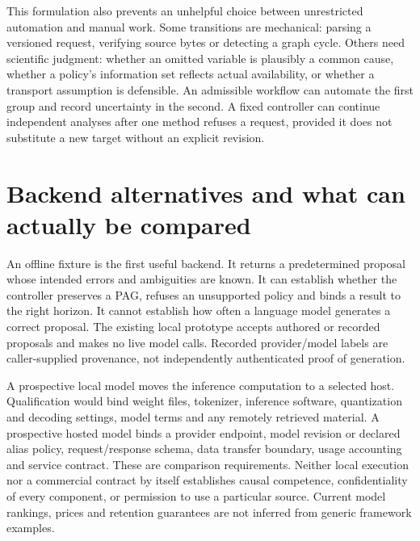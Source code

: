 This formulation also prevents an unhelpful choice between unrestricted
automation and manual work. Some transitions are mechanical: parsing a
versioned request, verifying source bytes or detecting a graph cycle. Others
need scientific judgment: whether an omitted variable is plausibly a common
cause, whether a policy's information set reflects actual availability, or
whether a transport assumption is defensible. An admissible workflow can
automate the first group and record uncertainty in the second. A fixed
controller can continue independent analyses after one method refuses a
request, provided it does not substitute a new target without an explicit
revision.

\section{Backend alternatives and what can actually be compared}

An offline fixture is the first useful backend. It returns a predetermined
proposal whose intended errors and ambiguities are known. It can establish
whether the controller preserves a PAG, refuses an unsupported policy and
binds a result to the right horizon. It cannot establish how often a language
model generates a correct proposal. The existing local prototype accepts
authored or recorded proposals and makes no live model calls. Recorded
provider/model labels are caller-supplied provenance, not independently
authenticated proof of generation. \citep{exec13_architecture_local,exec14_l6_local}

A prospective local model moves the inference computation to a selected
host. Qualification would bind weight files, tokenizer, inference software,
quantization and decoding settings, model terms and any remotely retrieved
material. A prospective hosted model binds a provider endpoint, model
revision or declared alias policy, request/response schema, data transfer
boundary, usage accounting and service contract. These are comparison
requirements. Neither local execution nor a commercial contract by itself
establishes causal competence, confidentiality of every component, or
permission to use a particular source. Current model rankings, prices and
retention guarantees are not inferred from generic framework examples.
\citep{exec14_l6_design}

